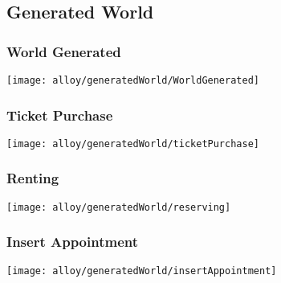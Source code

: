 \begin{landscape}
	\subsection{Generated World}
	
		\subsubsection{World Generated}
			\texttt{[image: alloy/generatedWorld/WorldGenerated]}
	
		\subsubsection{Ticket Purchase}
			\texttt{[image: alloy/generatedWorld/ticketPurchase]}
	
		\subsubsection{Renting}
			\texttt{[image: alloy/generatedWorld/reserving]}
		
		\subsubsection{Insert Appointment}
			\texttt{[image: alloy/generatedWorld/insertAppointment]}

\end{landscape}
	
	
